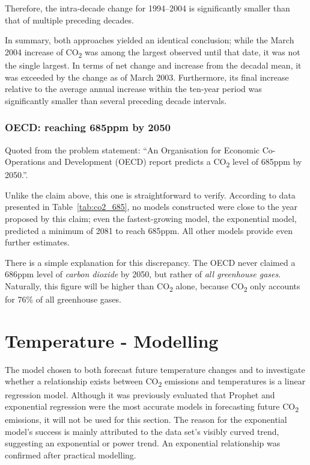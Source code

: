\documentclass[12pt]{mcmthesis}
\begin{document}
    Therefore, the intra-decade change for 1994--2004 is significantly smaller than that of multiple preceding decades.



    In summary, both approaches yielded an identical conclusion; while the March 2004 increase of CO\textsubscript{2} was among the largest observed until that date, it was not the single largest. In terms of net change and increase from the decadal mean, it was exceeded by the change as of March 2003. Furthermore, its final increase relative to the average annual increase within the ten-year period was significantly smaller than several preceding decade intervals.


    \subsubsection*{OECD: reaching 685ppm by 2050}

   Quoted from the problem statement: ``An Organisation for Economic Co-Operations and Development (OECD) report predicts a CO\textsubscript{2} level of 685ppm by 2050.''.

    Unlike the claim above, this one is straightforward to verify. According to data presented in Table~\ref{tab:co2_685}, no models constructed were close to the year proposed by this claim; even the fastest-growing model, the exponential model, predicted a minimum of 2081 to reach 685ppm.
    All other models provide even further estimates.

    There is a simple explanation for this discrepancy. The OECD never claimed a 686ppm level of \textit{carbon dioxide} by 2050, but rather of \textit{all greenhouse gases}. Naturally, this figure will be higher than CO\textsubscript{2} alone, because CO\textsubscript{2} only accounts for 76\% of all greenhouse gases.


    \section{Temperature - Modelling}

    The model chosen to both forecast future temperature changes and to investigate whether a relationship exists between CO\textsubscript{2} emissions and temperatures is a linear regression model. Although it was previously evaluated that Prophet and exponential regression were the most accurate models in forecasting future CO\textsubscript{2} emissions, it will not be used for this section. The reason for the exponential model’s success is mainly attributed to the data set’s visibly curved trend, suggesting an exponential or power trend. An exponential relationship was confirmed after practical modelling.
\end{document}

